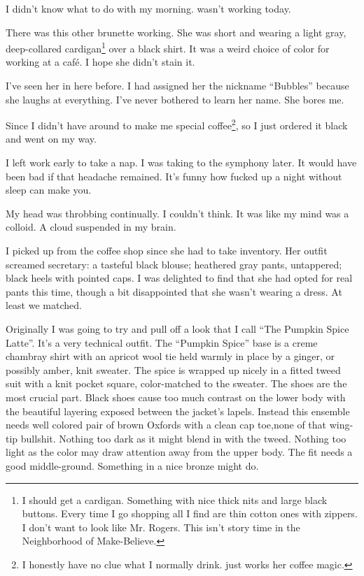 \noindent
I didn't know what to do with my morning.  \april{} wasn't working today.


There was this other brunette working.
She was short and wearing a light gray, deep-collared cardigan\footnote{
  I should get a cardigan.
  Something with nice thick nits and large black buttons.
  Every time I go shopping all I find are thin cotton ones with zippers.
  I don't want to look like Mr. Rogers.
  This isn't story time in the Neighborhood of Make-Believe.
} over a black shirt.
It was a weird choice of color for working at a caf\'e.
I hope she didn't stain it.


I've seen her in here before.
I had assigned her the nickname ``Bubbles'' because she laughs at everything.
I've never bothered to learn her name.  She bores me.


Since I didn't have \april{} around to make me special coffee\footnote{
I honestly have no clue what I normally drink.
\april{} just works her coffee magic.
}, so I just ordered it black and went on my way.
\VV


\noindent
I left work early to take a nap.
I was taking \april{} to the symphony later.
It would have been bad if that headache remained.
It's funny how fucked up a night without sleep can make you.


My head was throbbing continually.
I couldn't think.
It was like my mind was a colloid.
A cloud suspended in my brain.

\doublenewpage
\noindent
I picked up \april{} from the coffee shop since she had to take inventory.
Her outfit screamed secretary:  a tasteful black blouse;
heathered gray pants, untappered; black heels with pointed caps.
I was delighted to find that she had opted for real pants this time,
though a bit disappointed that she wasn't wearing a dress.
At least we matched.


Originally I was going to try and pull off a look that I call
``The Pumpkin Spice Latte''.
It's a very technical outfit.
The ``Pumpkin Spice'' base is a creme chambray shirt with an apricot wool tie
held warmly in place by a ginger, or possibly amber, knit sweater.
The spice is wrapped up nicely in a fitted tweed suit with a knit pocket
square, color-matched to the sweater.
The shoes are the most crucial part.
Black shoes cause too much contrast on the lower body with the beautiful
layering exposed between the jacket's lapels.
Instead this ensemble needs well colored pair of brown Oxfords with
a clean cap toe,none of that wing-tip bullshit.
Nothing too dark as it might blend in with the tweed.
Nothing too light as the color may draw attention away from
the upper body.
The fit needs a good middle-ground.
Something in a nice bronze might do.


